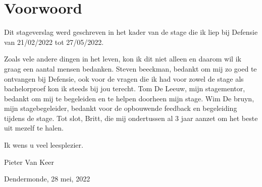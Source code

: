 \section{Voorwoord}
\label{sec:voorwoord}




Dit stageverslag werd geschreven in het kader van de stage die ik liep bij Defensie van 21/02/2022 tot 27/05/2022.

Zoals vele andere dingen in het leven, kon ik dit niet alleen en daarom wil ik graag een aantal mensen bedanken. Steven beeckman, bedankt om mij zo goed te ontvangen bij Defensie, ook voor de vragen die ik had voor zowel de stage als bachelorproef kon ik steeds bij jou terecht. Tom De Leeuw, mijn stagementor, bedankt om mij te begeleiden en te helpen doorheen mijn stage. Wim De bruyn, mijn stagebegeleider, bedankt voor de opbouwende feedback en begeleiding tijdens de stage. Tot slot, Britt, die mij ondertussen al 3 jaar aanzet om het beste uit mezelf te halen.

\begin{flushleft}
    
Ik wens u veel leesplezier.
\end{flushleft}

\begin{flushleft}

Pieter Van Keer

Dendermonde, 28 mei, 2022

\end{flushleft}